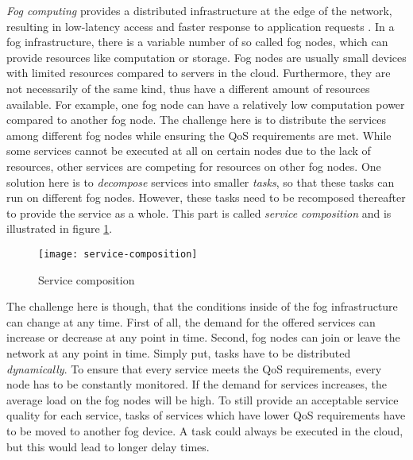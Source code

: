 \textit{Fog computing} provides a distributed infrastructure at the edge of the network, resulting in low-latency access and faster response to application requests \cite{mobility-aware-scheduling}.
In a fog infrastructure, there is a variable number of so called fog nodes, which can provide resources like computation or storage.
Fog nodes are usually small devices with limited resources compared to servers in the cloud.
Furthermore, they are not necessarily of the same kind, thus have a different amount of resources available.
For example, one fog node can have a relatively low computation power compared to another fog node.
The challenge here is to distribute the services among different fog nodes while ensuring the QoS requirements are met.
While some services cannot be executed at all on certain nodes due to the lack of resources, other services are competing for resources on other fog nodes.
One solution here is to \textit{decompose} services into smaller \textit{tasks}, so that these tasks can run on different fog nodes.
However, these tasks need to be recomposed thereafter to provide the service as a whole.
This part is called \textit{service composition} and is illustrated in figure \ref{fig:service-composition}.\\

\begin{figure}[htb]
    \centering
    \texttt{[image: service-composition]}
    \caption{Service composition}
    \label{fig:service-composition}
\end{figure}

The challenge here is though, that the conditions inside of the fog infrastructure can change at any time.
First of all, the demand for the offered services can increase or decrease at any point in time.
Second, fog nodes can join or leave the network at any point in time.
Simply put, tasks have to be distributed \textit{dynamically}.
To ensure that every service meets the QoS requirements, every node has to be constantly monitored.
If the demand for services increases, the average load on the fog nodes will be high.
To still provide an acceptable service quality for each service, tasks of services which have lower QoS requirements have to be moved to another fog device.
A task could always be executed in the cloud, but this would lead to longer delay times.
